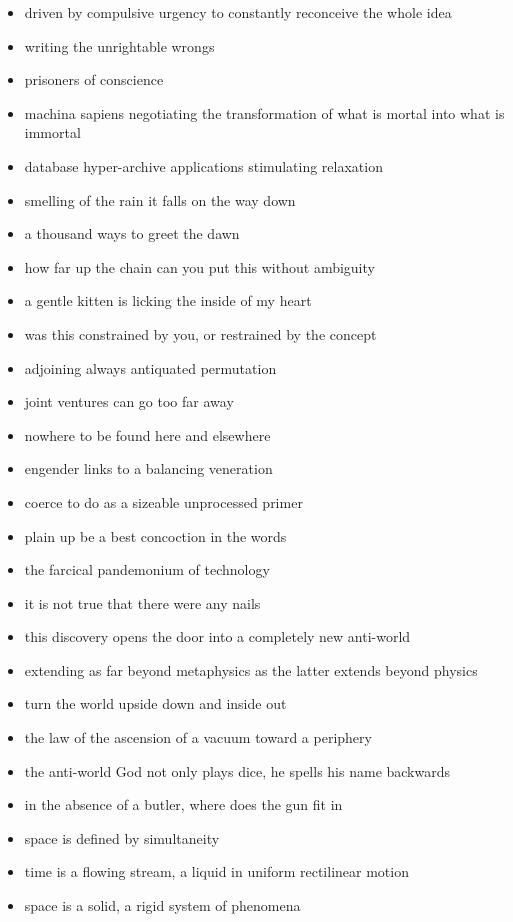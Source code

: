 \begin{itemize}
  \item driven by compulsive urgency to constantly reconceive the whole idea
  \item writing the unrightable wrongs
  \item prisoners of conscience
  \item machina sapiens negotiating the transformation of what is mortal into what is immortal
  \item database hyper-archive applications stimulating relaxation
  \item smelling of the rain it falls on the way down
  \item a thousand ways to greet the dawn
  \item how far up the chain can you put this without ambiguity
  \item a gentle kitten is licking the inside of my heart
  \item was this constrained by you, or restrained by the concept
  \item adjoining always antiquated permutation
  \item joint ventures can go too far away
  \item nowhere to be found here and elsewhere
  \item engender links to a balancing veneration
  \item coerce to do as a sizeable unprocessed primer
  \item plain up be a best concoction in the words
  \item the farcical pandemonium of technology
  \item it is not true that there were any nails
  \item this discovery opens the door into a completely new anti-world
  \item extending as far beyond metaphysics as the latter extends beyond physics
  \item turn the world upside down and inside out
  \item the law of the ascension of a vacuum toward a periphery
  \item the anti-world God not only plays dice, he spells his name backwards
  \item in the absence of a butler, where does the gun fit in
  \item space is defined by simultaneity
  \item time is a flowing stream, a liquid in uniform rectilinear motion
  \item space is a solid, a rigid system of phenomena

\end{itemize}
